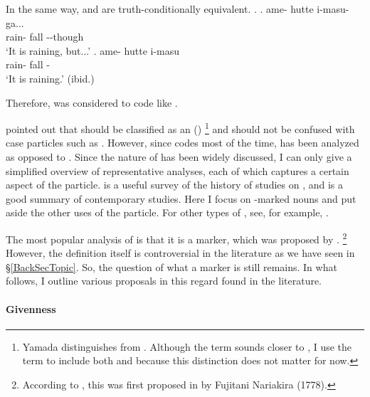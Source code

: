 In the same way,
\Next[a] and \Next[b] are truth-conditionally equivalent.
%
\ex.
 \ag. ame- hutte i-masu-ga... \\
      rain- fall --though \\
      `It is raining, but...'
 \bg. ame- hutte i-masu \\
      rain- fall - \\
      `It is raining.'
      \hfill{(ibid.)}

Therefore,  was considered to code  like .

 pointed out that
 should be classified as an  ()%
 \footnote{
 Yamada distinguishes  from .
 Although the  term  sounds closer to
 ,
 I use the term  to include both
  and 
 because this distinction does not matter for now. 
 }
and should not be confused with case particles such as .
However, since  codes  most of the time,
 has been analyzed as opposed to .
Since the nature of  has been widely discussed,
I can only give a simplified overview of representative analyses, each of which captures a certain aspect of the particle.
 is a useful survey of the history of studies on ,
and  is a good summary of contemporary studies.
Here I focus on -marked nouns and put aside the other uses of the particle. For other types of ,
see, for example, .

The most popular analysis of 
is that it is a  marker,
which was proposed by .%
 \footnote{
 According to ,
 this was first proposed in  by Fujitani Nariakira (1778).
 }
However, the definition  itself is controversial in the literature
as we have seen in \S \ref{BackSecTopic}.
So, the question of what a  marker is still remains.
In what follows, I outline various proposals in this regard found in the literature.

\paragraph{Givenness}

